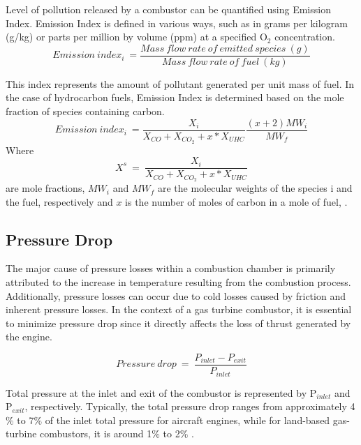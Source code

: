 Level of pollution released by a combustor can be quantified using Emission Index. Emission Index is defined in various ways, such as in grams per kilogram (g/kg) or parts per million by volume (ppm) at a specified O$_2$ concentration. 
\begin{equation}
    Emission\ index_i\ = \frac{Mass\ flow\ rate\ of\ emitted\ species\ (g)}{Mass\ flow\ rate\ of\ fuel\ (kg) }
\end{equation}

This index represents the amount of pollutant generated per unit mass of fuel. In the case of hydrocarbon fuels, Emission Index is determined based on the mole fraction of species containing carbon.
\begin{equation}
    Emission\ index_i\ = \frac{X_i}{X_{CO} + X_{CO_2} + x*X_{UHC}} \frac{(x+2)MW_i}{MW_f}
\end{equation}
Where
\begin{equation*}
    X^s \ = \ \frac{X_i}{X_{CO} + X_{CO_2} + x*X_{UHC}}
\end{equation*} are mole fractions, $MW_i$ and $MW_f$ are the molecular weights of the species i and the fuel, respectively and $x$ is the number of moles of carbon in a mole of fuel, \cite{StephenCombustion2011}.

\subsection{Pressure Drop}
The major cause of pressure losses within a combustion chamber is primarily attributed to the increase in temperature resulting from the combustion process. Additionally, pressure losses can occur due to cold losses caused by friction and inherent pressure losses. In the context of a gas turbine combustor, it is essential to minimize pressure drop since it directly affects the loss of thrust generated by the engine. 

\begin{equation}
    Pressure\ drop\ = \ \frac{P_{inlet}- P_{exit}}{P_{inlet}}
\end{equation}

Total pressure at the inlet and exit of the combustor is represented by P$_{inlet}$ and P$_{exit}$, respectively. Typically, the total pressure drop ranges from approximately 4$\%$ to 7$\%$ of the inlet total pressure for aircraft engines, while for land-based gas-turbine combustors, it is around 1$\%$ to 2$\%$ \cite{GTT1996}.

